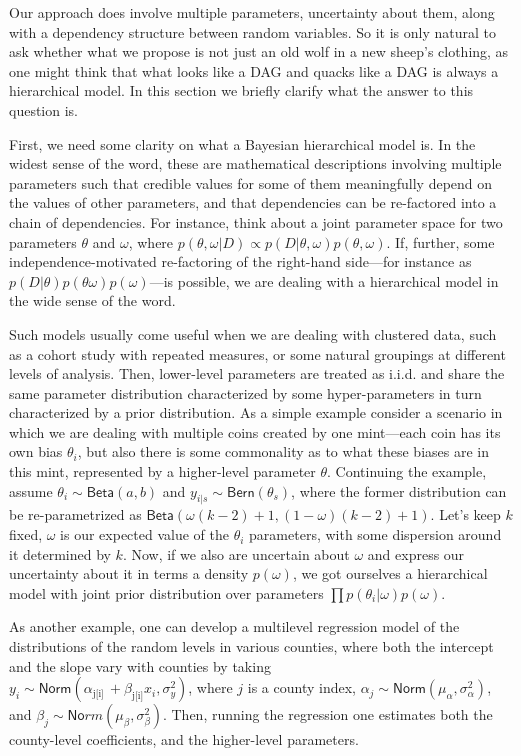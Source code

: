 \documentclass[
  letterpaper,
  DIV=11,
  numbers=noendperiod]{scrartcl}
\begin{document}
Our approach does involve multiple parameters, uncertainty about them,
along with a dependency structure between random variables. So it is
only natural to ask whether what we propose is not just an old wolf in a
new sheep's clothing, as one might think that what looks like a DAG and
quacks like a DAG is always a hierarchical model. In this section we
briefly clarify what the answer to this question is.

First, we need some clarity on what a Bayesian hierarchical model is. In
the widest sense of the word, these are mathematical descriptions
involving multiple parameters such that credible values for some of them
meaningfully depend on the values of other parameters, and that
dependencies can be re-factored into a chain of dependencies. For
instance, think about a joint parameter space for two parameters
\(\theta\) and \(\omega\), where
\(p(\theta, \omega \vert D) \propto p(D \vert \theta, \omega)p(\theta, \omega)\).
If, further, some independence-motivated re-factoring of the right-hand
side---for instance as
\(p(D\vert \theta)p(\theta \omega)p(\omega)\)---is possible, we are
dealing with a hierarchical model in the wide sense of the word.

Such models usually come useful when we are dealing with clustered data,
such as a cohort study with repeated measures, or some natural groupings
at different levels of analysis. Then, lower-level parameters are
treated as i.i.d. and share the same parameter distribution
characterized by some hyper-parameters in turn characterized by a prior
distribution. As a simple example consider a scenario in which we are
dealing with multiple coins created by one mint---each coin has its own
bias \(\theta_i\), but also there is some commonality as to what these
biases are in this mint, represented by a higher-level parameter
\(\theta\). Continuing the example, assume
\(\theta_i \sim \mathsf{Beta}(a, b)\) and
\(y_{i\vert s} \sim \mathsf{Bern}(\theta_s)\), where the former
distribution can be re-parametrized as
\(\mathsf{Beta}(\omega(k-2)+1, (1-\omega)(k-2)+1)\). Let's keep \(k\)
fixed, \(\omega\) is our expected value of the \(\theta_i\) parameters,
with some dispersion around it determined by \(k\). Now, if we also are
uncertain about \(\omega\) and express our uncertainty about it in terms
a density \(p(\omega)\), we got ourselves a hierarchical model with
joint prior distribution over parameters
\(\prod p(\theta_i \vert \omega) p(\omega)\).

As another example, one can develop a multilevel regression model of the
distributions of the random levels in various counties, where both the
intercept and the slope vary with counties by taking\\
\(y_i\sim \mathsf{Norm}(\alpha_{\mbox{j[i]}}\, + \beta_{\mbox{j[i]}} x_i, \sigma^2_y )\),
where \(j\) is a county index,
\(\alpha_j \sim \mathsf{Norm}(\mu_\alpha,\sigma_\alpha^2 )\), and
\(\beta_j \sim \mathsf{No}rm(\mu_\beta,\sigma_\beta^2 )\). Then, running
the regression one estimates both the county-level coefficients, and the
higher-level parameters.
\end{document}
